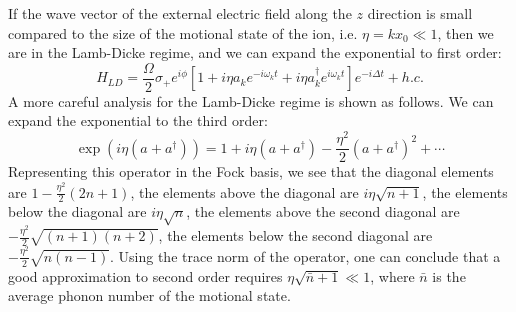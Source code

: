 \documentclass{notes2}
\begin{document}
If the wave vector of the external electric field along the $z$ direction is small compared to the size of the motional state of the ion, i.e. $\eta = k x_0 \ll 1$, then we are in the Lamb-Dicke regime, and we can expand the exponential to first order:
\begin{equation}
    H_{LD} =  \frac{\Omega}{2}\sigma_+e^{i\phi} \left[1 + i \eta a_k e^{-i \omega_k t} + i\eta a_k^\dagger e^{i \omega_k t}\right]e^{-i\Delta t} + h.c.
     \tag{Hamiltonian with Lamb-Dicke Approximation}
\end{equation}
A more careful analysis for the Lamb-Dicke regime is shown as follows. We can expand the exponential to the third order:
\begin{equation}
    \exp(i\eta (a + a^\dagger)) = 1 + i\eta (a + a^\dagger) - \frac{\eta^2}{2} (a + a^\dagger)^2  + \cdots 
\end{equation}
Representing this operator in the Fock basis, we see that the diagonal elements are $1 - \frac{\eta^2}{2} (2n + 1)$, the elements above the diagonal are $i\eta \sqrt{n+1}$, the elements below the diagonal are $i\eta \sqrt{n}$, the elements above the second diagonal are $-\frac{\eta^2}{2} \sqrt{(n+1)(n+2)}$, the elements below the second diagonal are $-\frac{\eta^2}{2} \sqrt{n(n-1)}$. Using the trace norm of the operator, one can conclude that a good approximation to second order requires $\eta\sqrt{\bar n + 1} \ll 1$, where $\bar n$ is the average phonon number of the motional state.
\end{document}
